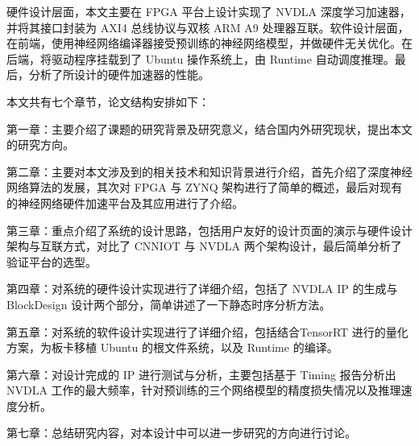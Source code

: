 硬件设计层面，本文主要在 FPGA 平台上设计实现了 NVDLA 深度学习加速器，并将其接口封装为 AXI4 总线协议与双核 ARM A9 处理器互联。软件设计层面，在前端，使用神经网络编译器接受预训练的神经网络模型，并做硬件无关优化。在后端，将驱动程序挂载到了 Ubuntu 操作系统上，由 Runtime 自动调度推理。最后，分析了所设计的硬件加速器的性能。

本文共有七个章节，论文结构安排如下：

第一章：主要介绍了课题的研究背景及研究意义，结合国内外研究现状，提出本文的研究方向。

第二章：主要对本文涉及到的相关技术和知识背景进行介绍，首先介绍了深度神经网络算法的发展，其次对 FPGA 与 ZYNQ 架构进行了简单的概述，最后对现有的神经网络硬件加速平台及其应用进行了介绍。

第三章：重点介绍了系统的设计思路，包括用户友好的设计页面的演示与硬件设计架构与互联方式，对比了 CNNIOT 与 NVDLA 两个架构设计，最后简单分析了验证平台的选型。

第四章：对系统的硬件设计实现进行了详细介绍，包括了 NVDLA IP 的生成与 BlockDesign 设计两个部分，简单讲述了一下静态时序分析方法。

第五章：对系统的软件设计实现进行了详细介绍，包括结合TensorRT 进行的量化方案，为板卡移植 Ubuntu 的根文件系统，以及 Runtime 的编译。

第六章：对设计完成的 IP 进行测试与分析，主要包括基于 Timing 报告分析出 NVDLA 工作的最大频率，针对预训练的三个网络模型的精度损失情况以及推理速度分析。

第七章：总结研究内容，对本设计中可以进一步研究的方向进行讨论。



